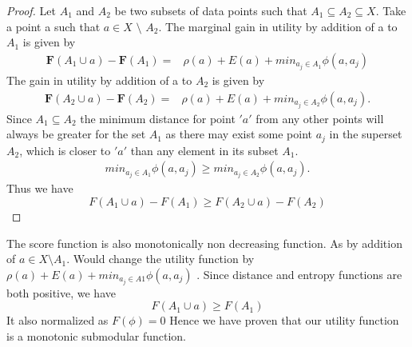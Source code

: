 \documentclass[a4paper,twoside]{iiththesis}
\theoremstyle{definition}
\theoremstyle{definition}
\theoremstyle{remark}
\begin{document}
\begin{proof}
Let $A_1$ and $A_2$ be two subsets of data points such that $A_1 \subseteq A_2 \subseteq X$. Take a point a such that $a \in X$ $\setminus$ $A_2 $.  The marginal gain in utility by addition of a to $A_1$ is given by
\begin{align}
        \mathbf{F}(A_1 \cup {a}) -  \mathbf{F}(A_1)=& \rho(a) + E(a)+ min_{a_j \in A_1} \phi(a,a_j)
\end{align}
The gain in utility by addition of a to $A_2$ is given by
\begin{align}
    \mathbf{F}(A_2 \cup {a}) - \mathbf{F}(A_2)=&\rho(a)+ E(a)+ min_{a_j \in A_2} \phi(a,a_j).
\end{align}
Since $A_1 \subseteq A_2 $ the minimum distance for point $'a'$ from any other points will always be greater for the set $A_1$ as there may exist some point $a_j$ in the superset $A_2$, which is closer to $'a'$ than any element in its subset $A_1$.
\begin{align}
          min_{a_j \in A_1} \phi(a,a_j) \geq min_{a_j \in A_2} \phi(a,a_j).
\end{align}
Thus we have 
\begin{equation}
F(A_1 \cup {a}) - F(A_1) \geq F(A_2 \cup {a}) - F(A_2)
\end{equation}
\end{proof}
The score function is also monotonically non decreasing function. As by addition of $a \in X  \setminus A_1$. Would change the utility function by $\rho(a) + E(a) + min_{a_j \in A1} \phi(a,a_j)$ . Since distance and entropy functions are both positive, we have  
\begin{equation}
F(A_1 \cup a) \geq F(A_1)
\end{equation}
It also normalized as  $F(\phi) = 0$
Hence we have proven that our utility function is a monotonic submodular function.
\end{document}
